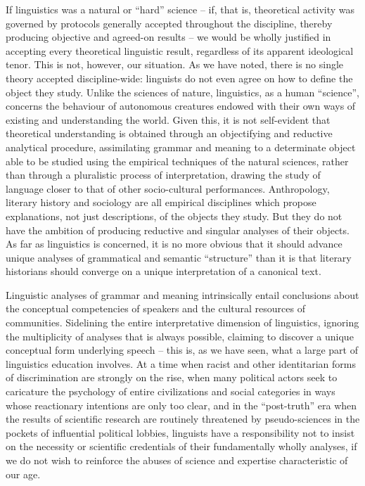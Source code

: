 \documentclass[output=paper]{langscibook}
\begin{document}
If linguistics was a natural or ``hard'' science -- if, that is, theoretical activity was governed by protocols generally accepted throughout the discipline, thereby producing objective and agreed-on results -- we would be wholly justified in accepting every theoretical linguistic result, regardless of its apparent ideological tenor. This is not, however, our situation. As we have noted, there is no single theory accepted discipline-wide: linguists do not even agree on how to define the object they study. Unlike the sciences of nature, linguistics, as a human ``science'', concerns the behaviour of autonomous creatures endowed with their own ways of existing and understanding the world. Given this, it is not self-evident that theoretical understanding is obtained through an objectifying and reductive analytical procedure, assimilating grammar and meaning to a determinate object able to be studied using the empirical techniques of the natural sciences, rather than through a pluralistic process of interpretation, drawing the study of language closer to that of other socio-cultural performances. Anthropology, literary history and sociology are all empirical disciplines which propose explanations, not just descriptions, of the objects they study. But they do not have the ambition of producing reductive and singular analyses of their objects. As far as linguistics is concerned, it is no more obvious that it should advance unique analyses of grammatical and semantic ``structure'' than it is that literary historians should converge on a unique interpretation of a canonical text.

Linguistic analyses of grammar and meaning intrinsically entail conclusions about the conceptual competencies of speakers and the cultural resources of communities. Sidelining the entire interpretative dimension of linguistics, ignoring the multiplicity of analyses that is always possible, claiming to discover a unique conceptual form underlying speech -- this is, as we have seen, what a large part of linguistics education involves. At a time when racist and other identitarian forms of discrimination are strongly on the rise, when many political actors seek to caricature the psychology of entire civilizations and social categories in ways whose reactionary intentions are only too clear, and in the ``post-truth'' era when the results of scientific research are routinely threatened by pseudo-sciences in the pockets of influential political lobbies, linguists have a responsibility not to insist on the necessity or scientific credentials of their fundamentally wholly  analyses, if we do not wish to reinforce the abuses of science and expertise characteristic of our age.
\end{document}
